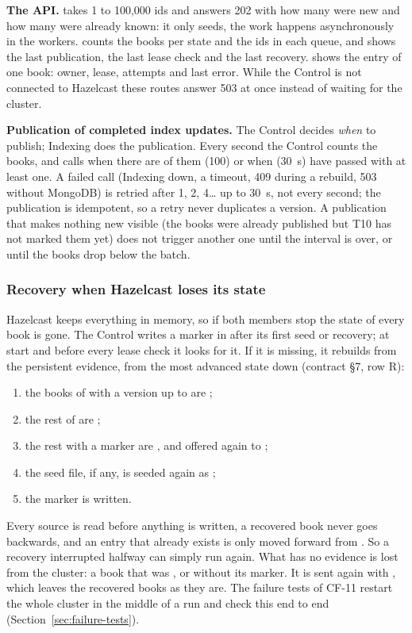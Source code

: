 \textbf{The API.}  takes 1 to 100,000 ids and answers 202 with how many were new and how many
were already known: it only seeds, the work happens asynchronously in the workers.  counts
the books per state and the ids in each queue, and shows the last publication, the last lease check and the last
recovery.  shows the entry of one book: owner, lease, attempts and last error. While the
Control is not connected to Hazelcast these routes answer 503  at once instead of
waiting for the cluster.

\textbf{Publication of completed index updates.} The Control decides \emph{when} to publish; Indexing does the
publication. Every second the Control counts the  books, and calls  when there are
 of them (100) or when  (30~s) have passed with at least one. A failed call
(Indexing down, a timeout, 409 during a rebuild, 503 without MongoDB) is retried after 1, 2, 4\ldots{} up to 30~s, not
every second; the publication is idempotent, so a retry never duplicates a version. A publication that makes nothing
new visible (the books were already published but T10 has not marked them yet) does not trigger another one until the
interval is over, or until the  books drop below the batch.

\subsubsection{Recovery when Hazelcast loses its state}
\label{sec:recovery}

Hazelcast keeps everything in memory, so if both members stop the state of every book is gone. The Control writes a
marker in  after its first seed or recovery; at start and before every lease check it looks
for it. If it is missing, it rebuilds  from the persistent evidence, from the most advanced state
down (contract §7, row R):
\begin{enumerate}
  \item the books of  with a version up to  are ;
  \item the rest of  are ;
  \item the rest with a  marker are , and offered again to ;
  \item the seed file, if any, is seeded again as ;
  \item the marker is written.
\end{enumerate}
Every source is read before anything is written, a recovered book never goes backwards, and an entry that already
exists is only moved forward from . So a recovery interrupted halfway can simply run again. What has no
evidence is lost from the cluster: a book that was , or  without its marker. It is sent again
with , which leaves the recovered books as they are. The failure tests of CF-11 restart the whole
cluster in the middle of a run and check this end to end (Section~\ref{sec:failure-tests}).
